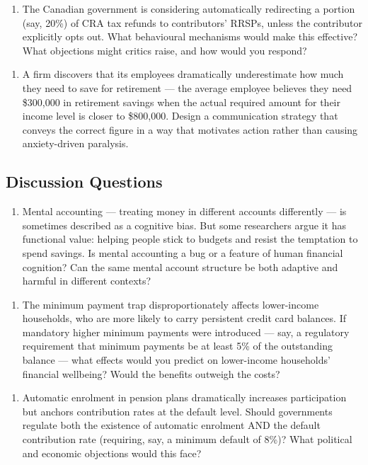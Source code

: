 \documentclass[12pt, letterpaper]{article}
\begin{document}
\begin{enumerate}
\item The Canadian government is considering automatically redirecting a portion (say, 20\%) of CRA tax refunds to contributors' RRSPs, unless the contributor explicitly opts out. What behavioural mechanisms would make this effective? What objections might critics raise, and how would you respond?
\end{enumerate}

\begin{enumerate}
\item A firm discovers that its employees dramatically underestimate how much they need to save for retirement --- the average employee believes they need \$300,000 in retirement savings when the actual required amount for their income level is closer to \$800,000. Design a communication strategy that conveys the correct figure in a way that motivates action rather than causing anxiety-driven paralysis.
\end{enumerate}


\subsection{Discussion Questions}


\begin{enumerate}
\item Mental accounting --- treating money in different accounts differently --- is sometimes described as a cognitive bias. But some researchers argue it has functional value: helping people stick to budgets and resist the temptation to spend savings. Is mental accounting a bug or a feature of human financial cognition? Can the same mental account structure be both adaptive and harmful in different contexts?
\end{enumerate}

\begin{enumerate}
\item The minimum payment trap disproportionately affects lower-income households, who are more likely to carry persistent credit card balances. If mandatory higher minimum payments were introduced --- say, a regulatory requirement that minimum payments be at least 5\% of the outstanding balance --- what effects would you predict on lower-income households' financial wellbeing? Would the benefits outweigh the costs?
\end{enumerate}

\begin{enumerate}
\item Automatic enrolment in pension plans dramatically increases participation but anchors contribution rates at the default level. Should governments regulate both the existence of automatic enrolment AND the default contribution rate (requiring, say, a minimum default of 8\%)? What political and economic objections would this face?
\end{enumerate}
\end{document}
